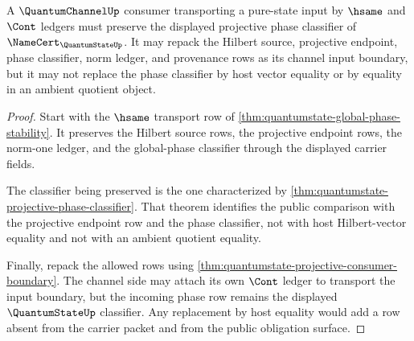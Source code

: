 \begin{theorem}
\label{thm:quantumstate-channel-phase-classifier-preservation}
A $\QuantumChannelUp$ consumer transporting a pure-state input by $\hsame$ and
$\Cont$ ledgers must preserve the displayed projective phase classifier of
$\NameCert_{\QuantumStateUp}$. It may repack the Hilbert source, projective
endpoint, phase classifier, norm ledger, and provenance rows as its channel
input boundary, but it may not replace the phase classifier by host vector
equality or by equality in an ambient quotient object.
\end{theorem}
\begin{proof}
Start with the $\hsame$ transport row of
\autoref{thm:quantumstate-global-phase-stability}. It preserves the Hilbert
source rows, the projective endpoint rows, the norm-one ledger, and the
global-phase classifier through the displayed carrier fields.

The classifier being preserved is the one characterized by
\autoref{thm:quantumstate-projective-phase-classifier}. That theorem identifies
the public comparison with the projective endpoint row and the phase classifier,
not with host Hilbert-vector equality and not with an ambient quotient equality.

Finally, repack the allowed rows using
\autoref{thm:quantumstate-projective-consumer-boundary}. The channel side may
attach its own $\Cont$ ledger to transport the input boundary, but the incoming
phase row remains the displayed $\QuantumStateUp$ classifier. Any replacement by
host equality would add a row absent from the carrier packet and from the public
obligation surface.
\end{proof}

